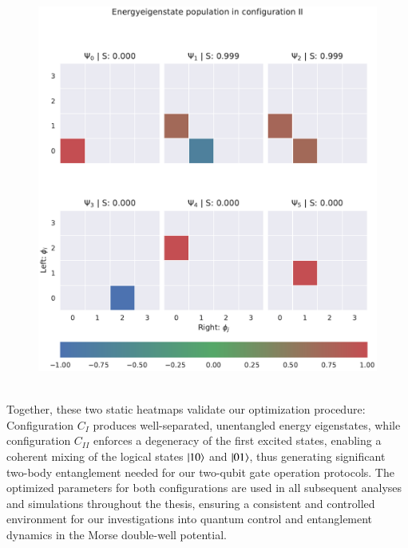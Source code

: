\documentclass{subfiles}
\begin{document}
\begin{figure}[h!]
    \centering
    \includegraphics[width=1.0\textwidth]{figs/state_populations_II.pdf}
    \label{fig:state_populations_II}
\end{figure}
\\

Together, these two static heatmaps validate our optimization procedure: Configuration $C_I$ produces well-separated, unentangled energy eigenstates, while configuration $C_{II}$ enforces a degeneracy of the first excited states, enabling a coherent mixing of the logical states $\ket{10}$ and $\ket{01}$, thus generating significant two-body entanglement needed for our two-qubit gate operation protocols. The optimized parameters for both configurations are used in all subsequent analyses and simulations throughout the thesis, ensuring a consistent and controlled environment for our investigations into quantum control and entanglement dynamics in the Morse double-well potential.
\end{document}
